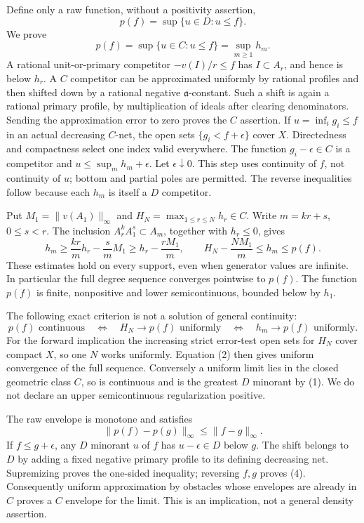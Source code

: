 Define only a raw function, without a positivity assertion,
\[
 p(f)=\sup\{u\in D:u\le f\}.
\]
We prove
\[
 p(f)=\sup\{u\in C:u\le f\}=\sup_{m\ge1}h_m.
 \tag{1}
\]
A rational unit-or-primary competitor $-v(I)/r\le f$ has $I\subset A_r$, and hence is below $h_r$. A $C$ competitor can be approximated uniformly by rational profiles and then shifted down by a rational negative $\mathfrak a$-constant. Such a shift is again a rational primary profile, by multiplication of ideals after clearing denominators. Sending the approximation error to zero proves the $C$ assertion. If $u=\inf_i g_i\le f$ in an actual decreasing $C$-net, the open sets $\{g_i<f+\epsilon\}$ cover $X$. Directedness and compactness select one index valid everywhere. The function $g_i-\epsilon\in C$ is a competitor and $u\le\sup_m h_m+\epsilon$. Let $\epsilon\downarrow0$. This step uses continuity of $f$, not continuity of $u$; bottom and partial poles are permitted. The reverse inequalities follow because each $h_m$ is itself a $D$ competitor.

Put $M_1=\|v(A_1)\|_\infty$ and $H_N=\max_{1\le r\le N}h_r\in C$. Write $m=kr+s$, $0\le s<r$. The inclusion $A_r^kA_1^s\subset A_m$, together with $h_r\le0$, gives
\[
 h_m\ge \frac{kr}{m}h_r-\frac{s}{m}M_1
 \ge h_r-\frac{rM_1}{m},\qquad
 H_N-\frac{NM_1}{m}\le h_m\le p(f).
 \tag{2}
\]
These estimates hold on every support, even when generator values are infinite. In particular the full degree sequence converges pointwise to $p(f)$. The function $p(f)$ is finite, nonpositive and lower semicontinuous, bounded below by $h_1$.

The following exact criterion is not a solution of general continuity:
\[
 p(f)\text{ continuous}\quad\Longleftrightarrow\quad H_N\to p(f)\text{ uniformly}
 \quad\Longleftrightarrow\quad h_m\to p(f)\text{ uniformly}. \tag{3}
\]
For the forward implication the increasing strict error-test open sets for $H_N$ cover compact $X$, so one $N$ works uniformly. Equation (2) then gives uniform convergence of the full sequence. Conversely a uniform limit lies in the closed geometric class $C$, so is continuous and is the greatest $D$ minorant by (1). We do not declare an upper semicontinuous regularization positive.

The raw envelope is monotone and satisfies
\[
 \|p(f)-p(g)\|_\infty\le\|f-g\|_\infty. \tag{4}
\]
If $f\le g+\epsilon$, any $D$ minorant $u$ of $f$ has $u-\epsilon\in D$ below $g$. The shift belongs to $D$ by adding a fixed negative primary profile to its defining decreasing net. Supremizing proves the one-sided inequality; reversing $f,g$ proves (4). Consequently uniform approximation by obstacles whose envelopes are already in $C$ proves a $C$ envelope for the limit. This is an implication, not a general density assertion.

